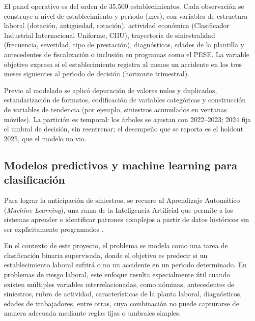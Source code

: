 El panel operativo es del orden de 35.500 establecimientos. Cada observaci\'on se construye a nivel de establecimiento y per\'{\i}odo (mes), con variables de estructura laboral (dotaci\'on, antig\"uedad, rotaci\'on), actividad econ\'omica (Clasificador Industrial Internacional Uniforme, CIIU), trayectoria de siniestralidad (frecuencia, severidad, tipo de prestaci\'on), diagn\'osticos, edades de la plantilla y antecedentes de fiscalizaci\'on o inclusi\'on en programas como el PESE. La variable objetivo expresa si el establecimiento registra al menos un accidente en los tres meses siguientes al per\'{\i}odo de decisi\'on (horizonte trimestral).

Previo al modelado se aplic\'o depuraci\'on de valores nulos y duplicados, estandarizaci\'on de formatos, codificaci\'on de variables categ\'oricas y construcci\'on de variables de tendencia (por ejemplo, siniestros acumulados en ventanas m\'oviles). La partici\'on es temporal: los \'arboles se ajustan con 2022--2023; 2024 fija el umbral de decisi\'on, sin reentrenar; el desempe\~no que se reporta es el holdout 2025, que el modelo no vio.

\subsection{Modelos predictivos y machine learning para clasificaci\'on}\label{sec:modelos-ml}

Para lograr la anticipaci\'on de siniestros, se recurre al Aprendizaje Autom\'atico (\emph{Machine Learning}), una rama de la Inteligencia Artificial que permite a los sistemas aprender e identificar patrones complejos a partir de datos hist\'oricos sin ser expl\'{\i}citamente programados \parencite{bishop2006}.

En el contexto de este proyecto, el problema se modela como una tarea de clasificaci\'on binaria supervisada, donde el objetivo es predecir si un establecimiento laboral sufrir\'a o no un accidente en un per\'{\i}odo determinado. En problemas de riesgo laboral, este enfoque resulta especialmente \'util cuando existen m\'ultiples variables interrelacionadas, como n\'ominas, antecedentes de siniestros, rubro de actividad, caracter\'{\i}sticas de la planta laboral, diagn\'osticos, edades de trabajadores, entre otras, cuya combinaci\'on no puede capturarse de manera adecuada mediante reglas fijas o umbrales simples.

